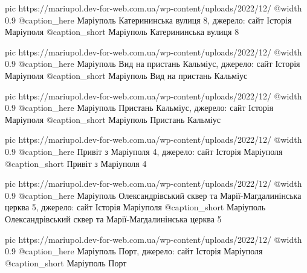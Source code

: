 	pic https://mariupol.dev-for-web.com.ua/wp-content/uploads/2022/12/%
	@width 0.9
	@caption_here Маріуполь Катерининська вулиця 8, джерело: сайт Історія Маріуполя
	@caption_short Маріуполь Катерининська вулиця 8

	pic https://mariupol.dev-for-web.com.ua/wp-content/uploads/2022/12/%
	@width 0.9
	@caption_here Маріуполь Вид на пристань Кальміус, джерело: сайт Історія Маріуполя
	@caption_short Маріуполь Вид на пристань Кальміус

	pic https://mariupol.dev-for-web.com.ua/wp-content/uploads/2022/12/%
	@width 0.9
	@caption_here Маріуполь Пристань Кальміус, джерело: сайт Історія Маріуполя
	@caption_short Маріуполь Пристань Кальміус

	pic https://mariupol.dev-for-web.com.ua/wp-content/uploads/2022/12/%
	@width 0.9
	@caption_here Привіт з Маріуполя 4, джерело: сайт Історія Маріуполя
	@caption_short Привіт з Маріуполя 4

	pic https://mariupol.dev-for-web.com.ua/wp-content/uploads/2022/12/%
	@width 0.9
	@caption_here Маріуполь Олександрівський сквер та Марії-Магдалинінська церква 5, джерело: сайт Історія Маріуполя
	@caption_short Маріуполь Олександрівський сквер та Марії-Магдалинінська церква 5

	pic https://mariupol.dev-for-web.com.ua/wp-content/uploads/2022/12/%
	@width 0.9
	@caption_here Маріуполь Порт, джерело: сайт Історія Маріуполя
	@caption_short Маріуполь Порт

